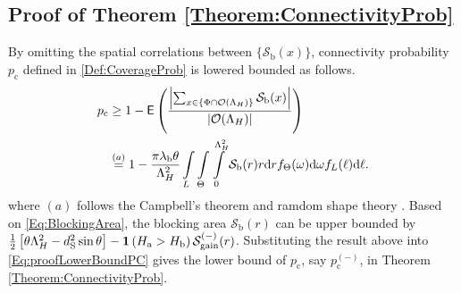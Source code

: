 \documentclass[12pt, draftclsnofoot, onecolumn]{IEEEtran}
\begin{document}
\subsection{Proof of Theorem \ref{Theorem:ConnectivityProb}}\label{Proof:theorem1}
By omitting the spatial correlations between $\{\mathcal{S}_{\textrm{b}}(x)\}$, connectivity probability $p_\mathrm{c}$ defined in \eqref{Def:CoverageProb} is lowered bounded as follows.
\begin{align}\label{Eq:proofLowerBoundPC}
p_\mathrm{c} &\geq 1 - \mathsf{E}\left(\frac{\left|\sum_{x\in \{\Phi\cap\mathcal{O}(\Lambda_H)\}}\mathcal{S}_{\textrm{b}}(x)\right|}{\left|\mathcal{O}(\Lambda_H)\right|}\right) \nonumber \\
&\overset{(a)}{=} 1 - \frac{\pi \lambda_\mathrm{b}\theta}{\Lambda_H^2} \int\limits_{L} \int\limits_{\Theta} \int\limits_{0}^{\Lambda_H^2} \mathcal{S}_{\textrm{b}}(r) r \mathrm{d} r  f_{\Theta}(\omega) \mathrm{d} \omega f_{L}(\ell) \mathrm{d} \ell.
\end{align}
where $(a)$ follows the Campbell's theorem and ramdom shape theory \cite{gupta2018macrodiversity}. Based on \eqref{Eq:BlockingArea}, the blocking area $\mathcal{S}_{\textrm{b}}(r)$ can be upper bounded by $\frac{1}{2}\left[\theta \Lambda_H^2  - d_{\textrm{S}}^2\sin\theta\right] - \mathbf{1}\left( H_{\textrm{a}} > H_{\textrm{b}} \right)\mathcal{S}^{(-)}_{\textrm{gain}}(r)$.
Substituting the result above into \eqref{Eq:proofLowerBoundPC} gives the lower bound of $p_\mathrm{c}$, say $p_\mathrm{c}^{(-)}$, in Theorem \ref{Theorem:ConnectivityProb}.
\end{document}
